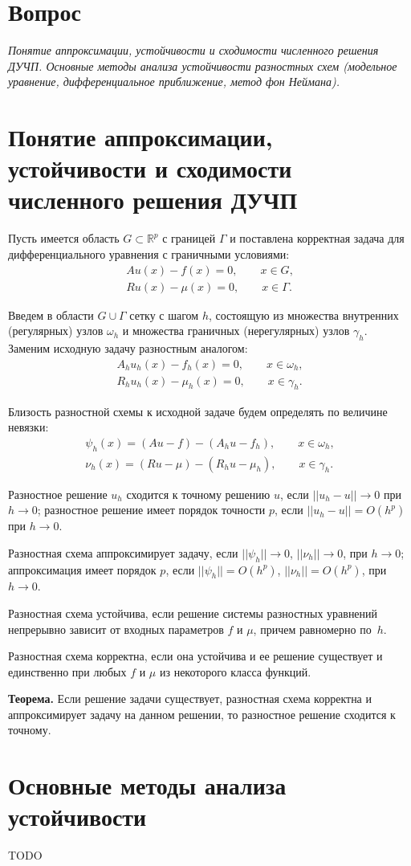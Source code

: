 \documentclass[a4paper,12pt]{article}
\begin{document}
\section*{Вопрос }
{\em Понятие аппроксимации, устойчивости и сходимости численного
решения ДУЧП. Основные методы анализа устойчивости разностных схем
(модельное уравнение, дифференциальное приближение, метод фон Неймана).}


\section{Понятие аппроксимации, устойчивости и сходимости численного
решения ДУЧП}

Пусть имеется область $G\subset\mathbb{R}^p$ с границей $\Gamma$ и
поставлена корректная задача для дифференциального уравнения
с граничными условиями:
\begin{gather*}
Au(x)-f(x)=0,\qquad x\in G,\\
Ru(x)-\mu(x)=0,\qquad x\in\Gamma.
\end{gather*}

Введем в области $G\cup\Gamma$ сетку с шагом $h$, состоящую из множества
внутренних (регулярных) узлов $\omega_h$ и множества граничных (нерегулярных)
узлов $\gamma_h$. Заменим исходную задачу разностным аналогом:
\begin{gather*}
A_hu_h(x)-f_h(x)=0,\qquad x\in\omega_h,\\
R_hu_h(x)-\mu_h(x)=0,\qquad x\in\gamma_h.
\end{gather*}

Близость разностной схемы к исходной задаче будем определять
по величине невязки:
\begin{gather*}
\psi_h(x)=(Au-f)-(A_hu-f_h),\qquad x\in\omega_h,\\
\nu_h(x)=(Ru-\mu)-(R_hu-\mu_h),\qquad x\in\gamma_h.
\end{gather*}

Разностное решение $u_h$ сходится к точному решению $u$, если
$||u_h-u||\to0$ при $h\to0$;
разностное решение имеет порядок точности $p$, если
$||u_h-u||=O(h^p)$ при $h\to0$.

Разностная схема аппроксимирует задачу, если
$||\psi_h||\to0$, $||\nu_h||\to0$, при $h\to0$;
аппроксимация имеет порядок $p$, если
$||\psi_h||=O(h^p)$, $||\nu_h||=O(h^p)$, при $h\to0$.

Разностная схема устойчива, если решение системы разностных уравнений
непрерывно зависит от входных параметров $f$ и $\mu$, причем равномерно
по~$h$.

Разностная схема корректна, если она устойчива и ее решение существует
и единственно при любых $f$ и $\mu$ из некоторого класса функций.

\textbf{Теорема.} Если решение задачи существует, разностная схема
корректна и аппроксимирует задачу на данном решении, то
разностное решение сходится к точному.


\section{Основные методы анализа устойчивости}

TODO
\end{document}
